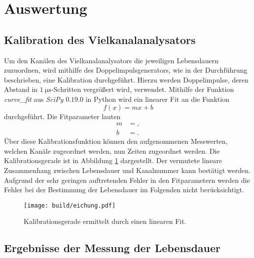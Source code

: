 \section{Auswertung}
\label{sec:Auswertung}


\subsection{Kalibration des Vielkanalanalysators}

Um den Kanälen des Vielkanalanalysators die jeweiligen Lebensdauern zuzuordnen, wird mithilfe des Doppelimpulsgenerators, wie in der Durchführung beschrieben, eine Kalibration durchgeführt.
Hierzu werden Doppelimpulse, deren Abstand in $\SI{1}{\micro\second}$-Schritten vergrößert wird, verwendet.
Mithilfe der Funktion \emph{curve\_fit} aus \emph{SciPy $0.19.0$} in Python \cite{scipy} wird ein linearer Fit an die Funktion
\begin{equation}
  f(x) = mx + b \label{linfit}
\end{equation}
durchgeführt.
Die Fitparameter lauten
\begin{align*}
  m &= ,\\
  b &= .
\end{align*}
Über diese Kalibrationsfunktion können den aufgenommenen Messwerten, welchen Kanäle zugeordnet werden, nun Zeiten zugeordnet werden.
Die Kalibrationsgerade ist in Abbildung \ref{plot:kali} dargestellt.
Der vermutete lineare Zusammenhang zwischen Lebensdauer und Kanalnummer kann bestätigt werden.
Aufgrund der sehr geringen auftretenden Fehler in den Fitparametern werden die Fehler bei der Bestimmung der Lebensdauer im Folgenden nicht berücksichtigt.

\begin{figure}
  \centering
  \texttt{[image: build/eichung.pdf]}
  \caption{Kalibrationsgerade ermittelt durch einen linearen Fit.}
  \label{plot:kali}
\end{figure}

\subsection{Ergebnisse der Messung der Lebensdauer}

